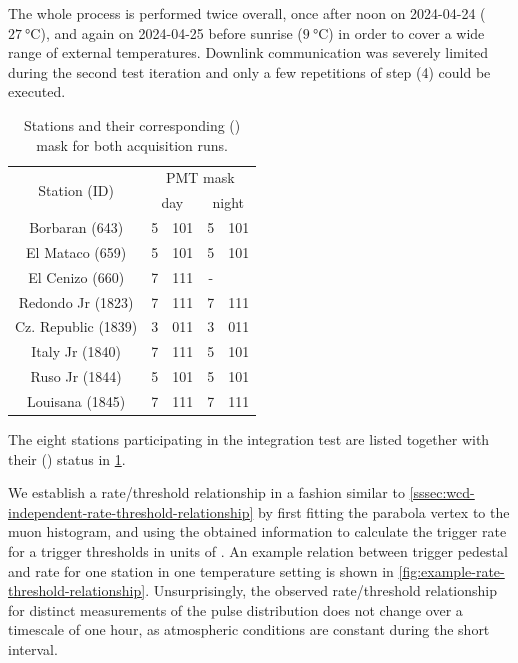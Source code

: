 \noindent The whole process is performed twice overall, once after noon 
on 2024-04-24 ($\SI{27}{\celsius}$), and again on 2024-04-25 before sunrise 
($\SI{9}{\celsius}$) in order to cover a wide range of external 
temperatures. Downlink communication was severely limited during the second 
test iteration and only a few repetitions of step (4) could be executed.

\begin{table}
    \centering
    \caption{Stations and their corresponding (\WCD) \PMT mask for both acquisition runs.}
    \begin{tabular}{c|cc|cc}
	 \toprule
	 \multirow{2}{*}{Station (ID)} & \multicolumn{4}{c}{PMT mask} \\
	 & \multicolumn{2}{c}{day} & \multicolumn{2}{c}{night} \\
	 \midrule
	Borbaran (643) & 5 & 101 & 5 & 101 \\
	El Mataco (659) & 5 & 101 & 5 & 101 \\
	El Cenizo (660) & 7 & 111 & - \\
	Redondo Jr (1823) & 7 & 111 & 7 & 111 \\
	Cz. Republic (1839) & 3 & 011 & 3 & 011 \\
	Italy Jr (1840) & 7 & 111 & 5 & 101 \\
	Ruso Jr (1844) & 5 & 101 & 5 & 101 \\
	Louisana (1845) & 7 & 111 & 7 & 111 \\
	\bottomrule
    \end{tabular}
    \label{tab:muonAcquisition-station-list}
\end{table}

\noindent The eight stations participating in the integration test are 
listed together with their (\WCD) \PMT status in 
\cref{tab:muonAcquisition-station-list}.

We establish a rate/threshold relationship in a fashion similar to
\cref{sssec:wcd-independent-rate-threshold-relationship} by first
fitting the parabola vertex to the muon histogram, and using the 
obtained information to calculate the trigger rate for a trigger
thresholds in units of \MipOffline. An example relation between
trigger pedestal and rate for one station in one temperature setting
is shown in \cref{fig:example-rate-threshold-relationship}. 
Unsurprisingly, the observed rate/threshold relationship for distinct 
measurements of the \SSD pulse distribution does not change over a 
timescale of one hour, as atmospheric conditions are constant during 
the short interval.

